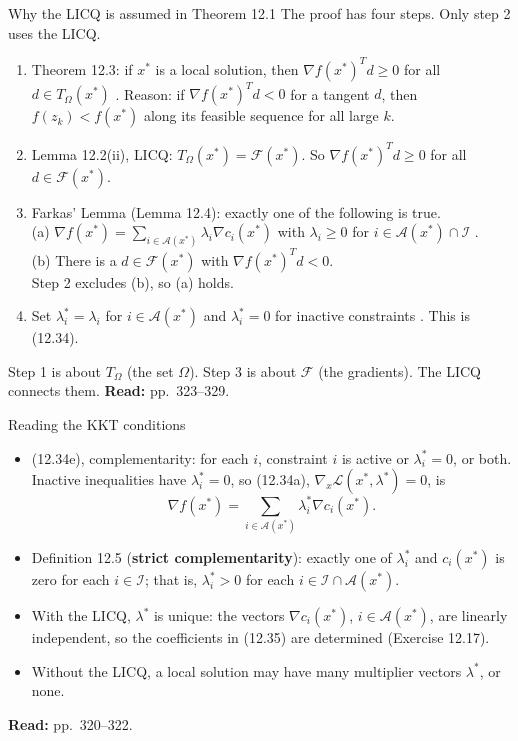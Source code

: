 \documentclass[aspectratio=169,12pt]{beamer}
\newcommand{\xs}{x^{*}}
\newcommand{\gradf}{\nabla f}
\newcommand{\eqn}[1]{\text{\small(#1)}}
\newcommand{\readbook}[1]{{\color{red}\textbf{Read:} #1}}
\newcommand{\ls}{\lambda^{*}}
\newcommand{\cA}{\mathcal{A}}
\newcommand{\cF}{\mathcal{F}}
\newcommand{\cI}{\mathcal{I}}
\newcommand{\cL}{\mathcal{L}}
\newcommand{\TO}{T_{\Omega}}
\begin{document}
\begin{frame}{Why the LICQ is assumed in Theorem 12.1}
  The proof has four steps. Only step 2 uses the LICQ.
  \begin{enumerate}\setlength\itemsep{0.3em}
    \item Theorem 12.3: if $\xs$ is a local solution, then $\gradf(\xs)^{T}d\ge 0$ for all $d\in\TO(\xs)$
      \eqn{12.43}. Reason: if $\gradf(\xs)^{T}d<0$ for a tangent $d$, then $f(z_{k})<f(\xs)$ along its
      feasible sequence for all large $k$.
    \item Lemma 12.2(ii), \alert{LICQ}: $\TO(\xs)=\cF(\xs)$. So $\gradf(\xs)^{T}d\ge 0$ for all $d\in\cF(\xs)$.
    \item Farkas' Lemma (Lemma 12.4): exactly one of the following is true.\\
      (a) $\gradf(\xs)=\sum_{i\in\cA(\xs)}\lambda_{i}\nabla c_{i}(\xs)$ with $\lambda_{i}\ge 0$ for
      $i\in\cA(\xs)\cap\cI$ \eqn{12.51}.\\
      (b) There is a $d\in\cF(\xs)$ with $\gradf(\xs)^{T}d<0$.\\
      Step 2 excludes (b), so (a) holds.
    \item Set $\ls_{i}=\lambda_{i}$ for $i\in\cA(\xs)$ and $\ls_{i}=0$ for inactive constraints \eqn{12.52}.
      This is (12.34).
  \end{enumerate}
  Step 1 is about $\TO$ (the set $\Omega$). Step 3 is about $\cF$ (the gradients). The LICQ connects them.
  \readbook{pp.~323--329.}
\end{frame}

\begin{frame}{Reading the KKT conditions}
  \begin{itemize}\setlength\itemsep{0.5em}
    \item (12.34e), complementarity: for each $i$, constraint $i$ is active or $\ls_{i}=0$, or both.
      Inactive inequalities have $\ls_{i}=0$, so (12.34a), $\nabla_{x}\cL(\xs,\ls)=0$, is
      \[ \gradf(\xs)=\sum_{i\in\cA(\xs)}\ls_{i}\nabla c_{i}(\xs) . \tag{12.35} \]
    \item Definition 12.5 (\textbf{strict complementarity}): exactly one of $\ls_{i}$ and $c_{i}(\xs)$
      is zero for each $i\in\cI$; that is, $\ls_{i}>0$ for each $i\in\cI\cap\cA(\xs)$.
    \item With the LICQ, $\ls$ is unique: the vectors $\nabla c_{i}(\xs)$, $i\in\cA(\xs)$, are linearly
      independent, so the coefficients in (12.35) are determined (Exercise 12.17).
    \item Without the LICQ, a local solution may have many multiplier vectors $\ls$, or none.
  \end{itemize}
  \readbook{pp.~320--322.}
\end{frame}
\end{document}
